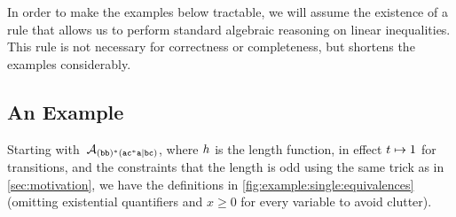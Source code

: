 \documentclass[acmsmall,review,anonymous,screen]{acmart}\settopmatter{printfolios=true,printccs=true,printacmref=true}
\theoremstyle{definition}
\begin{document}
In order to make the examples below tractable, we will assume the existence of a
rule \EquationReasoning{} that allows us to perform standard algebraic reasoning
on linear inequalities. This rule is not necessary for correctness or
completeness, but shortens the examples considerably.

\subsection{An Example}

Starting with~$\mathcal{A}_{\mathtt{(bb)^\ast(ac^\ast{}a|bc)}}{}$, where $h$ is the length function, in effect
$t \mapsto 1$ for transitions, and the constraints that the length is
odd using the same trick as in \cref{sec:motivation}, we have the
definitions in \cref{fig:example:single:equivalences} (omitting existential
quantifiers and $x \geq 0$ for every variable to avoid clutter).
\end{document}
